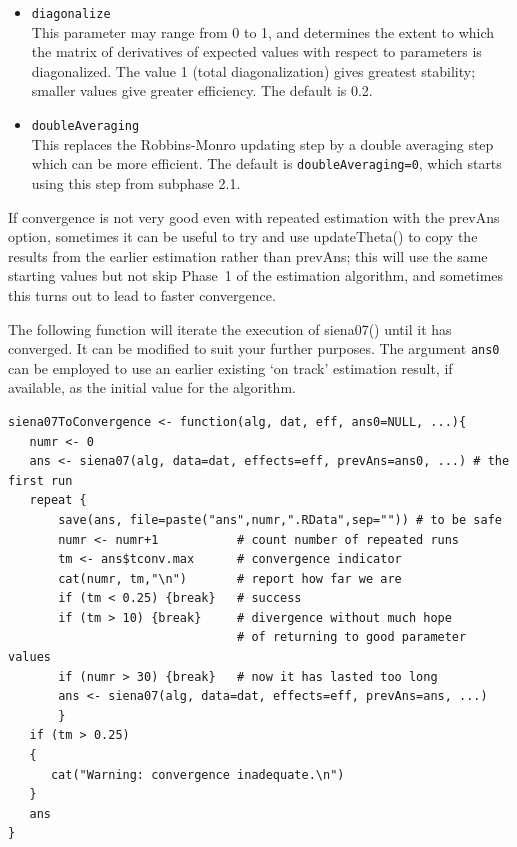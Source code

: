 \documentclass[a4paper,fleqn,11pt]{article}
\newcommand{\+}{\, + \,}
\newcommand{\sfn}[1]{\textsf{#1}}
\begin{document}
\begin{itemize}
\item \texttt{diagonalize}\\
    This parameter may range from 0 to 1,
    and determines the extent to which the matrix of derivatives of expected
    values with respect to parameters is diagonalized.
    The value 1 (total diagonalization) gives greatest stability;
    smaller values give greater efficiency.
    The default is 0.2.
\item \texttt{doubleAveraging}\\
      This replaces the Robbins-Monro updating step by a double averaging
      step \citep{bather1989,SchwabeWalk96,KushnerYin03} which can be
      more efficient. The default is \texttt{doubleAveraging=0}, which starts using
      this step from subphase 2.1.
\end{itemize}


If convergence is not very good even with repeated estimation with
the \sfn{prevAns} option, sometimes it can be useful to try and use
\sfn{updateTheta()} to copy the results from the earlier estimation
rather than \sfn{prevAns}; this will use the same starting values
but not skip Phase~1 of the estimation algorithm, and sometimes
this turns out to lead to faster convergence.
\medskip

The following function will
iterate the execution of \sfn{siena07()} until it has converged.
It can be modified to suit your further purposes.
The argument \texttt{ans0} can be employed to use an earlier existing
`on track' estimation result, if available, as the initial value
for the algorithm.

\begin{verbatim}
siena07ToConvergence <- function(alg, dat, eff, ans0=NULL, ...){
   numr <- 0
   ans <- siena07(alg, data=dat, effects=eff, prevAns=ans0, ...) # the first run
   repeat {
       save(ans, file=paste("ans",numr,".RData",sep="")) # to be safe
       numr <- numr+1           # count number of repeated runs
       tm <- ans$tconv.max      # convergence indicator
       cat(numr, tm,"\n")       # report how far we are
       if (tm < 0.25) {break}   # success
       if (tm > 10) {break}     # divergence without much hope
                                # of returning to good parameter values
       if (numr > 30) {break}   # now it has lasted too long
       ans <- siena07(alg, data=dat, effects=eff, prevAns=ans, ...)
       }
   if (tm > 0.25)
   {
      cat("Warning: convergence inadequate.\n")
   }
   ans
}
\end{verbatim}
\end{document}
